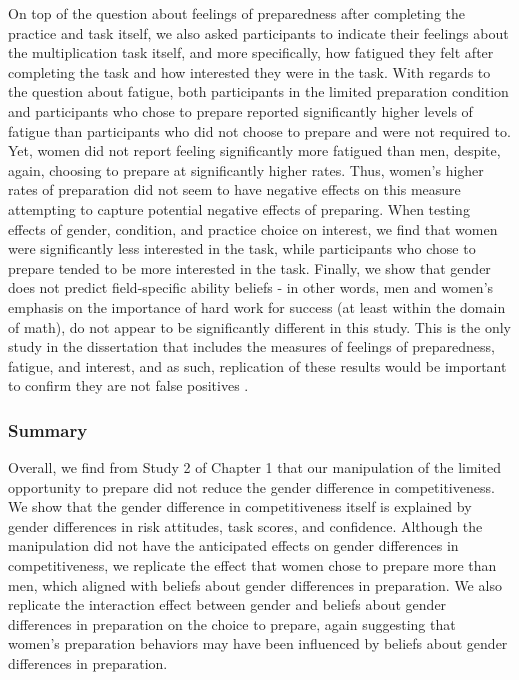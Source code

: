 \documentclass[letterpaper, nobind]{templates/ociamthesis}
\begin{document}
On top of the question about feelings of preparedness after completing the practice and task itself, we also asked participants to indicate their feelings about the multiplication task itself, and more specifically, how fatigued they felt after completing the task and how interested they were in the task. With regards to the question about fatigue, both participants in the limited preparation condition and participants who chose to prepare reported significantly higher levels of fatigue than participants who did not choose to prepare and were not required to. Yet, women did not report feeling significantly more fatigued than men, despite, again, choosing to prepare at significantly higher rates. Thus, women's higher rates of preparation did not seem to have negative effects on this measure attempting to capture potential negative effects of preparing. When testing effects of gender, condition, and practice choice on interest, we find that women were significantly less interested in the task, while participants who chose to prepare tended to be more interested in the task. Finally, we show that gender does not predict field-specific ability beliefs - in other words, men and women's emphasis on the importance of hard work for success (at least within the domain of math), do not appear to be significantly different in this study. This is the only study in the dissertation that includes the measures of feelings of preparedness, fatigue, and interest, and as such, replication of these results would be important to confirm they are not false positives \autocite{Coffman2015}.

\hypertarget{summary-1}{%
\subsubsection{Summary}\label{summary-1}}

Overall, we find from Study 2 of Chapter 1 that our manipulation of the limited opportunity to prepare did not reduce the gender difference in competitiveness. We show that the gender difference in competitiveness itself is explained by gender differences in risk attitudes, task scores, and confidence. Although the manipulation did not have the anticipated effects on gender differences in competitiveness, we replicate the effect that women chose to prepare more than men, which aligned with beliefs about gender differences in preparation. We also replicate the interaction effect between gender and beliefs about gender differences in preparation on the choice to prepare, again suggesting that women's preparation behaviors may have been influenced by beliefs about gender differences in preparation.
\end{document}
